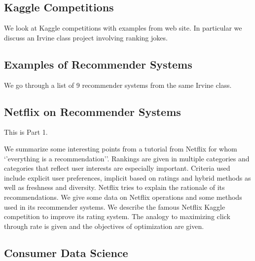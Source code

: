 

\subsection{Kaggle Competitions}\label{kaggle-competitions}

We look at Kaggle competitions with examples from web site. In
particular we discuss an Irvine class project involving ranking jokes.



\subsection{Examples of Recommender
Systems}\label{examples-of-recommender-systems}

We go through a list of 9 recommender systems from the same Irvine
class.



\subsection{Netflix on Recommender
Systems}\label{netflix-on-recommender-systems}

This is Part 1.

We summarize some interesting points from a tutorial from Netflix for
whom `'everything is a recommendation''. Rankings are given in multiple
categories and categories that reflect user interests are especially
important. Criteria used include explicit user preferences, implicit
based on ratings and hybrid methods as well as freshness and diversity.
Netflix tries to explain the rationale of its recommendations. We give
some data on Netflix operations and some methods used in its recommender
systems. We describe the famous Netflix Kaggle competition to improve
its rating system. The analogy to maximizing click through rate is given
and the objectives of optimization are given.



\subsection{Consumer Data Science}\label{consumer-data-science}

